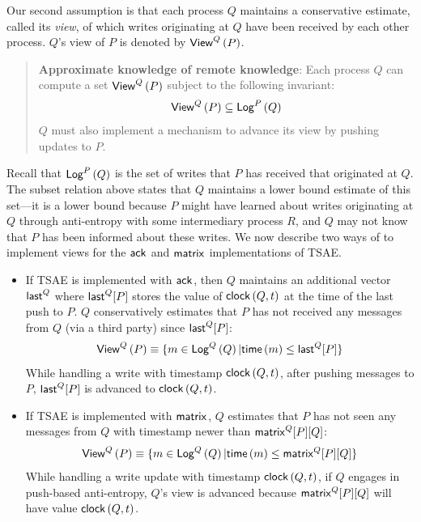 \documentclass[]             %
{NASA}                       %
\theoremstyle{definition}
\begin{document}
Our second assumption is that each process $Q$ maintains a
conservative estimate, called its \emph{view}, of which writes
originating at $Q$ have been received by each other process. $Q$'s
view of $P$ is denoted by $\mathsf{View}^{Q}\left(P\right)$.
\begin{quote}
  \textbf{Approximate knowledge of remote knowledge}: Each process $Q$
  can compute a set $\mathsf{View}^{Q}\left(P\right)$ subject to the following invariant:
  \begin{equation*}
    \mathsf{View}^{Q}\left(P\right) \subseteq \mathsf{Log}^{P}\left(Q\right)
  \end{equation*}
  $Q$ must also implement a mechanism to advance its view by
  pushing updates to $P$.
\end{quote}
Recall that $\mathsf{Log}^{P}\left(Q\right)$ is the set of writes that $P$ has received
that originated at $Q$. The subset relation above states that $Q$
maintains a lower bound estimate of this set---it is a lower bound
because $P$ might have learned about writes originating at $Q$ through
anti-entropy with some intermediary process $R$, and $Q$ may not know
that $P$ has been informed about these writes. We now describe two
ways of to implement views for the $\mathsf{ack}^{}$ and $\mathsf{matrix}^{}$
implementations of TSAE.
\begin{itemize}
\item If TSAE is implemented with $\mathsf{ack}^{}{}$, then $Q$ maintains an
  additional vector $\mathsf{last}^{Q}$ where $\mathsf{last}^{Q}[P]$ stores the value
  of $\mathsf{clock}\left(Q,t\right)$ at the time of the last push to $P$. $Q$
  conservatively estimates that $P$ has not received any messages from $Q$
  (via a third party) since $\mathsf{last}^{Q}[P]$:
  \begin{equation}
    \mathsf{View}^{Q}\left(P\right) \equiv \{ m \in \mathsf{Log}^{Q}\left(Q\right) | \mathsf{time}\left(m\right) \leq
    \mathsf{last}^{Q}[P] \}
  \end{equation}
  While handling a write with timestamp $\mathsf{clock}\left(Q, t\right)$, after pushing
  messages to $P$, $\mathsf{last}^{Q}[P]$ is advanced to $\mathsf{clock}\left(Q, t\right)$.
\item If TSAE is implemented with $\mathsf{matrix}^{}$, $Q$ estimates that $P$ has
  not seen any messages from $Q$ with timestamp newer than
  $\mathsf{matrix}^{Q}[P][Q]$:
  \begin{equation}
    \mathsf{View}^{Q}\left(P\right) \equiv \{ m \in \mathsf{Log}^{Q}\left(Q\right) | \mathsf{time}\left(m\right) \leq
    \mathsf{matrix}^{Q}[P][Q] \}
  \end{equation}
  While handling a write update with timestamp $\mathsf{clock}\left(Q, t\right)$, if $Q$
  engages in push-based anti-entropy, $Q$'s view is advanced because
  $\mathsf{matrix}^{Q}[P][Q]$ will have value $\mathsf{clock}\left(Q, t\right)$.
\end{itemize}
\end{document}
